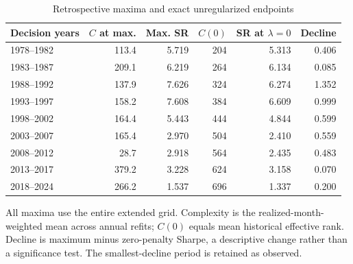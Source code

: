 \begin{table}[!htbp]\centering\small\setlength{\tabcolsep}{5pt}
\caption{Retrospective maxima and exact unregularized endpoints}\label{tab:historical_endpoints}
\begin{tabular}{@{}lrrrrr@{}}\toprule
Decision years & $C$ at max. & Max. SR & $C(0)$ & SR at $\lambda=0$ & Decline \\ \midrule
1978--1982 & 113.4 & 5.719 & 204 & 5.313 & 0.406 \\
1983--1987 & 209.1 & 6.219 & 264 & 6.134 & 0.085 \\
1988--1992 & 137.9 & 7.626 & 324 & 6.274 & 1.352 \\
1993--1997 & 158.2 & 7.608 & 384 & 6.609 & 0.999 \\
1998--2002 & 164.4 & 5.443 & 444 & 4.844 & 0.599 \\
2003--2007 & 165.4 & 2.970 & 504 & 2.410 & 0.559 \\
2008--2012 & 28.7 & 2.918 & 564 & 2.435 & 0.483 \\
2013--2017 & 379.2 & 3.228 & 624 & 3.158 & 0.070 \\
2018--2024 & 266.2 & 1.537 & 696 & 1.337 & 0.200 \\
\bottomrule\end{tabular}\par\vspace{5pt}
\begin{minipage}{\textwidth}\footnotesize All maxima use the entire extended grid. Complexity is the realized-month-weighted mean across annual refits; $C(0)$ equals mean historical effective rank. Decline is maximum minus zero-penalty Sharpe, a descriptive change rather than a significance test. The smallest-decline period is retained as observed.\end{minipage}\end{table}
